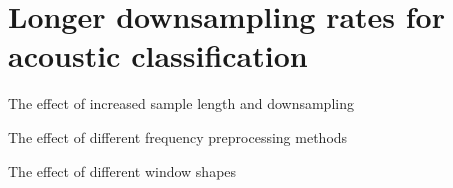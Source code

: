\chapter{Longer downsampling rates for acoustic classification
\label{chap:9}}

The effect of increased sample length and downsampling

The effect of different frequency preprocessing methods

The effect of different window shapes

